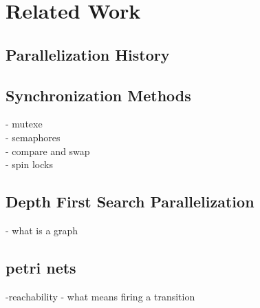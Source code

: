 \chapter{Related Work}

\section{Parallelization History}
\section{Synchronization Methods}
- mutexe\\
- semaphores\\
- compare and swap\\
- spin locks\\
\section{Depth First Search Parallelization}
- what is a graph

\section{petri nets}
-reachability
- what means firing a transition